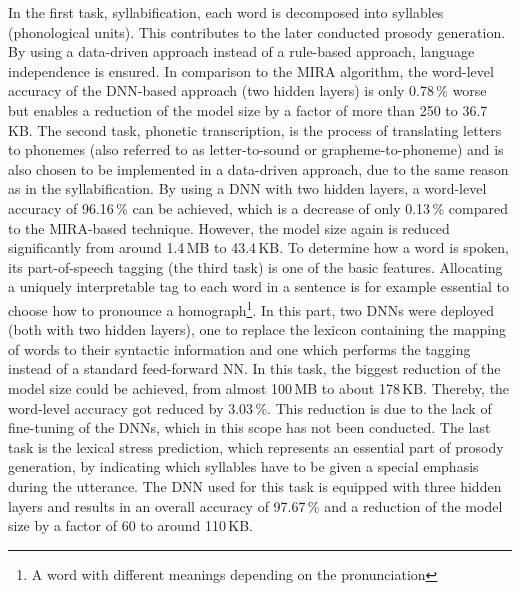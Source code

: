 In the first task, syllabification, each word is decomposed into syllables (phonological units). This contributes to the later conducted prosody generation. By using a data-driven approach instead of a rule-based approach, language independence is ensured. In comparison to the \ac{MIRA} algorithm, the word-level accuracy of the \ac{DNN}-based approach (two hidden layers) is only 0.78\,\% worse but enables a reduction of the model size by a factor of more than 250 to 36.7\,KB.
The second task, phonetic transcription, is the process of translating letters to phonemes (also referred to as letter-to-sound or grapheme-to-phoneme) and is also chosen to be implemented in a data-driven approach, due to the same reason as in the syllabification. By using a \ac{DNN} with two hidden layers, a word-level accuracy of 96.16\,\% can be achieved, which is a decrease of only 0.13\,\% compared to the \ac{MIRA}-based technique. However, the model size again is reduced significantly from around 1.4\,MB to 43.4\,KB.
To determine how a word is spoken, its part-of-speech tagging (the third task) is one of the basic features. Allocating a uniquely interpretable tag to each word in a sentence is for example essential to choose how to pronounce a homograph\footnote{A word with different meanings depending on the pronunciation}. In this part, two \acp{DNN} were deployed (both with two hidden layers), one to replace the lexicon containing the mapping of words to their syntactic information and one which performs the tagging instead of a standard feed-forward \ac{NN}. In this task, the biggest reduction of the model size could be achieved, from almost 100\,MB to about 178\,KB. Thereby, the word-level accuracy got reduced by 3.03\,\%. This reduction is due to the lack of fine-tuning of the \acp{DNN}, which in this scope has not been conducted.
The last task is the lexical stress prediction, which represents an essential part of prosody generation, by indicating which syllables have to be given a special emphasis during the utterance. The \ac{DNN} used for this task is equipped with three hidden layers and results in an overall accuracy of 97.67\,\% and a reduction of the model size by a factor of 60 to around 110\,KB.

